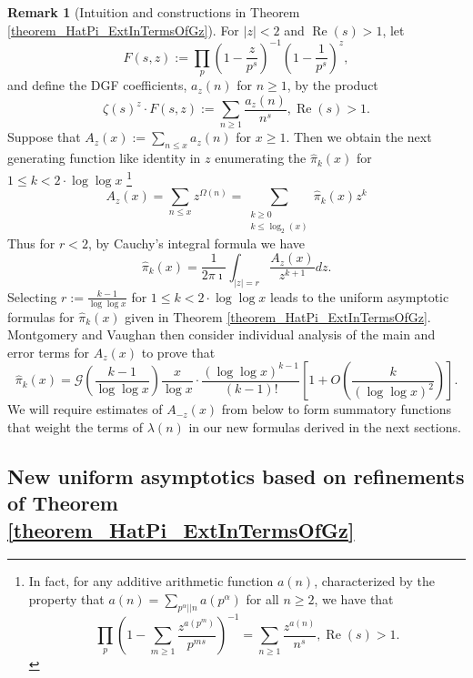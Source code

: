 \documentclass[11pt,reqno,a4letter]{article}
\numberwithin{figure}{section}
\numberwithin{table}{section}
\newcommand{\cf}{\textit{cf.\ }}
\theoremstyle{plain}
\numberwithin{theorem}{section}
\theoremstyle{definition}
\newtheorem{remark}[theorem]{Remark}
\renewcommand{\Re}{\operatorname{Re}}
\begin{document}
\begin{remark}[Intuition and constructions in Theorem \ref{theorem_HatPi_ExtInTermsOfGz}] 
\label{remark_intuitionConstrIn_theorem_HatPi_ExtInTermsOfGz} 
For $|z| < 2$ and $\Re(s) > 1$, let 
\begin{equation} 
\label{eqn_IntuitionMVThm_FszFuncDef_v1} 
F(s, z) := \prod_{p} \left(1 - \frac{z}{p^s}\right)^{-1} \left(1 - \frac{1}{p^s}\right)^{z}, 
\end{equation} 
and define the DGF coefficients, $a_z(n)$ for $n \geq 1$, by the product 
\[
\zeta(s)^{z} \cdot F(s, z) := \sum_{n \geq 1} \frac{a_z(n)}{n^s}, \Re(s) > 1. 
\]
Suppose that $A_z(x) := \sum_{n \leq x} a_z(n)$ for $x \geq 1$. Then we obtain the next 
generating function like identity in $z$ enumerating the $\widehat{\pi}_k(x)$ for 
$1 \leq k < 2 \cdot \log\log x$ \footnote{ 
     In fact, for any additive arithmetic function $a(n)$, 
     characterized by the property that 
     $a(n) = \sum_{p^{\alpha} || n} a(p^{\alpha})$ for all $n \geq 2$, we have that 
     \cite[\cf \S 1.7]{IWANIEC-KOWALSKI} 
     \[
     \prod_p \left( 
          1 - \sum_{m \geq 1} \frac{z^{a(p^m)}}{p^{ms}}\right)^{-1} = 
          \sum_{n \geq 1} \frac{z^{a(n)}}{n^s}, \Re(s) > 1. 
     \]
}
\begin{equation} 
\label{eqn_remark_MV_AzxCoeffFormlaIntegral_v1} 
A_z(x) = \sum_{n \leq x} z^{\Omega(n)} = \sum_{\substack{k \geq 0 \\ k \leq \log_2(x)}} \widehat{\pi}_k(x) z^k 
\end{equation} 
Thus for $r < 2$, by Cauchy's integral formula we have 
\[
\widehat{\pi}_k(x) = \frac{1}{2\pi\imath} \int_{|z|=r} \frac{A_z(x)}{z^{k+1}} dz. 
\]
Selecting $r := \frac{k-1}{\log\log x}$ for $1 \leq k < 2 \cdot \log\log x$ 
leads to the uniform asymptotic formulas for $\widehat{\pi}_k(x)$ given in 
Theorem \ref{theorem_HatPi_ExtInTermsOfGz}. 
Montgomery and Vaughan then consider individual analysis of the main and error 
terms for $A_z(x)$ to prove that 
\[
\widehat{\pi}_k(x) = \mathcal{G}\left(\frac{k-1}{\log\log x}\right) \frac{x}{\log x} \cdot 
     \frac{(\log\log x)^{k-1}}{(k-1)!} \left[1 + O\left(\frac{k}{(\log\log x)^2}\right)\right]. 
\]
We will require estimates of $A_{-z}(x)$ from below to form summatory functions 
that weight the terms of $\lambda(n)$ in our new formulas derived in the next sections. 
\end{remark} 

\subsection{New uniform asymptotics based on refinements of Theorem \ref{theorem_HatPi_ExtInTermsOfGz}} 
\label{subSection_PartialPrimeProducts_Proofs} 
\end{document}
